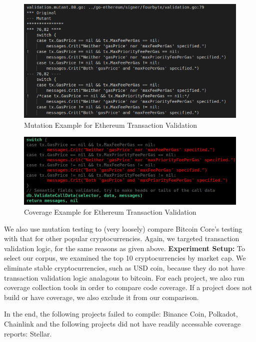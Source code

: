 \begin{figure}
\vspace{2mm}
\includegraphics[width=0.9\columnwidth]{mutation-example.png}
\caption{Mutation Example for Ethereum Transaction Validation}
\label{fig:mutation}
\end{figure}

\begin{figure}
\vspace{2mm}
\includegraphics[width=0.9\columnwidth]{coverage-example.png}
\caption{Coverage Example for Ethereum Transaction Validation}
\label{fig:coverage}
\end{figure}

We also use mutation testing to (very loosely) compare Bitcoin Core's testing
with that for other popular cryptocurrencies. Again, we targeted
transaction validation logic, for the same reasons as given above. 
\newline
\newline
\noindent \textbf{Experiment Setup:} To select
our corpus, we examined the top 10 cryptocurrencies by market cap. We eliminate stable cryptocurrencies, such as USD coin,
because they do not have transaction validation logic analagous to bitcoin. For each project, we also run coverage collection
tools in order to compare code coverage. If a project does not build or have coverage, we also exclude it from our comparison.

In the end, the following projects failed to compile: Binance Coin, Polkadot, Chainlink and the following projects did not have
readily accessable coverage reports: Stellar.

